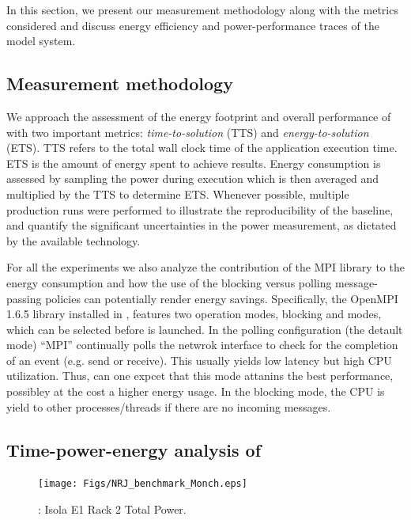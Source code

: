 In this section, we present our measurement methodology along with the
metrics considered and discuss energy efficiency and power-performance
traces of the model system.

\subsection{Measurement methodology}
\label{subsec:4.1}

We  approach  the  assessment  of  the energy  footprint  and  overall
performance   of   \cosmoart   with  two   important  metrics:
\textit{time-to-solution} (TTS) and \textit{energy-to-solution} (ETS).
TTS refers to  the total wall clock time  of the application execution
time. ETS  is the amount of  energy spent to  achieve results.  Energy
consumption  is  assessed by  sampling  the  power during execution which is then averaged and multiplied  by the TTS to determine  ETS. Whenever  possible,  multiple production  runs  were
performed  to  illustrate the  reproducibility  of  the baseline,  and
quantify the  significant uncertainties  in the power  measurement, as
dictated by the available technology.

For all the experiments we also analyze the contribution of the MPI library to the energy consumption and how the use of the blocking versus polling message-passing policies can potentially render energy savings. Specifically, the OpenMPI 1.6.5 library installed in \tinto, features two operation modes, blocking and modes, which can be selected before \cosmoart is launched. In the polling configuration (the detault mode) ``MPI'' continually polls
the netwrok interface to check for the completion of an event (e.g. send or receive).
This usually yields low latency but high CPU utilization. Thus, can one expcet that this mode attanins the best performance, possibley at the cost a higher energy usage. In the blocking
mode, the CPU is yield to other processes/threads if there are no incoming messages.


\subsection{Time-power-energy analysis of \cosmoart}
\label{subsec:4.2}

\begin{figure}[htbf]
  \begin{center}
    \texttt{[image: Figs/NRJ\_benchmark\_Monch.eps]}
    \caption{\monch: Isola E1 Rack 2 Total Power.}
    \label{fig:1}
  \end{center}
\end{figure}

